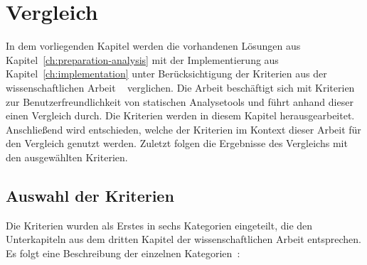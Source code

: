 \chapter{Vergleich}\label{ch:comparison}

In dem vorliegenden Kapitel werden die vorhandenen Lösungen aus Kapitel~\ref{ch:preparation-analysis} mit
der Implementierung aus Kapitel~\ref{ch:implementation} unter Berücksichtigung der Kriterien aus der wissenschaftlichen Arbeit
~\cite[A Large-Scale Study of Usability Criteria Addressed by Static Analysis Tools]{usability-criteria-static-analysis-tools} verglichen.
Die Arbeit beschäftigt sich mit Kriterien zur Benutzerfreundlichkeit von statischen Analysetools und führt anhand dieser einen
Vergleich durch. Die Kriterien werden in diesem Kapitel herausgearbeitet. Anschließend wird entschieden, welche der Kriterien
im Kontext dieser Arbeit für den Vergleich genutzt werden. Zuletzt folgen die Ergebnisse des Vergleichs mit den ausgewählten Kriterien.

\section{Auswahl der Kriterien}

Die Kriterien wurden als Erstes in sechs Kategorien eingeteilt, die den Unterkapiteln aus dem dritten Kapitel der wissenschaftlichen Arbeit
entsprechen. Es folgt eine Beschreibung der einzelnen Kategorien~\cite{usability-criteria-static-analysis-tools}:

